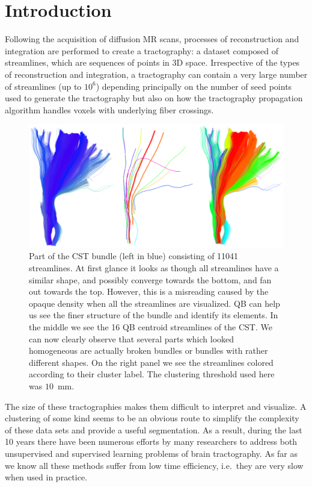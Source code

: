 \documentclass{bioinfo}
\begin{document}
\section{Introduction}

Following the acquisition of diffusion MR scans, processes of
reconstruction and integration are performed to create a tractography: a
dataset composed of streamlines, which are sequences of points in 3D
space. Irrespective of the types of reconstruction and integration, a
tractography can contain a very large number of streamlines (up to
$10^6$) depending principally on the number of seed points used to
generate the tractography but also on how the tractography propagation 
algorithm handles voxels with underlying fiber crossings.

\begin{figure}[htp]
\centerline{\includegraphics[width=160mm]{Figures/Fig_4_cst_simplification_relabeled_triple.eps}}
\caption{Part of the CST bundle (left in blue) consisting of \num{11041}
  streamlines. At first glance it looks as though all streamlines have a
  similar shape, and possibly converge towards the bottom, and fan out
  towards the top. However, this is a misreading caused by the opaque
  density when all the streamlines are visualized.  QB can help us see
  the finer structure of the bundle and identify its elements. In the
  middle we see the 16 QB centroid streamlines of the CST. We can now
  clearly observe that several parts which looked homogeneous are
  actually broken bundles or bundles with rather different shapes. On
  the right panel we see the streamlines colored according to their
  cluster label. The clustering threshold used here was
  $10$~mm. \label{Flo:cst_pbc}}
\end{figure}


The size of these tractographies makes them difficult to interpret and
visualize. A clustering of some kind seems to be an obvious route to
simplify the complexity of these data sets and provide a useful
segmentation. As a result, during the last 10 years there have been
numerous efforts by many researchers to address both unsupervised and
supervised learning problems of brain tractography.  As far as we know
all these methods suffer from low time efficiency, i.e.~they are very
slow when used in practice.
\end{document}
